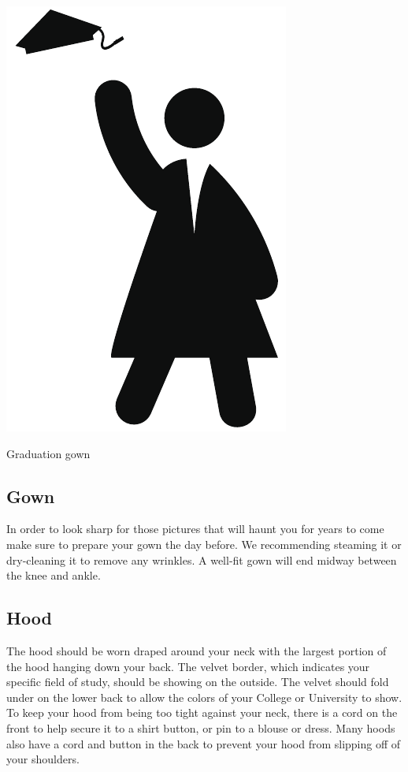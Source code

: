 \documentclass{tufte-handout}
\begin{document}
\begin{marginfigure}[\baselineskip]%
  \includegraphics[width=.4\linewidth]{gownbw}
  \caption{\linespread{1.3}\selectfont{}Graduation gown}
  \label{fig:gown}
\end{marginfigure}

\subsection{Gown}
In order to look sharp for those pictures that will haunt you for years to come make sure to prepare your gown the day before. We recommending steaming it or dry-cleaning it to remove any wrinkles. A well-fit gown will end midway between the knee and ankle.

\subsection{Hood}
The hood should be worn draped around your neck with the largest portion of the hood hanging down your back. The velvet border, which indicates your specific field of study, should be showing on the outside. The velvet should fold under on the lower back to allow the colors of your College or University to show. To keep your hood from being too tight against your neck, there is a cord on the front to help secure it to a shirt button, or pin to a blouse or dress. Many hoods also have a cord and button in the back to prevent your hood from slipping off of your shoulders.
\end{document}
